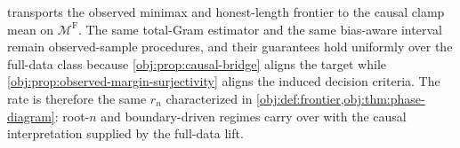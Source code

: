  transports the observed minimax and honest-length frontier to the causal clamp mean on \(\mathcal M^{\mathrm F}\). The same total-Gram estimator and the same bias-aware interval remain observed-sample procedures, and their guarantees hold uniformly over the full-data class because \cref{obj:prop:causal-bridge} aligns the target while \cref{obj:prop:observed-margin-surjectivity} aligns the induced decision criteria. The rate is therefore the same \(r_n\) characterized in \cref{obj:def:frontier,obj:thm:phase-diagram}: root-\(n\) and boundary-driven regimes carry over with the causal interpretation supplied by the full-data lift.
